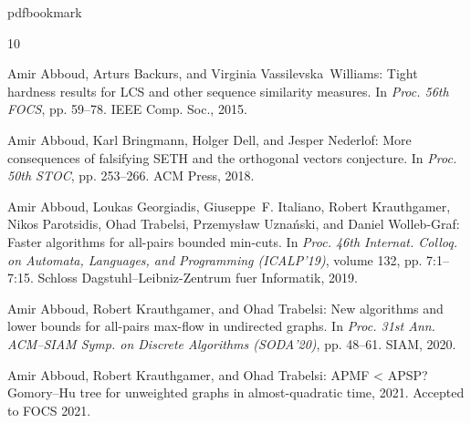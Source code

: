 \newcommand{\prelim}{Preliminary version in\ }
\providecommand{\bibhead}[1]{}
\expandafter\ifx\csname pdfbookmark\endcsname\relax%
  \providecommand{\tocrefpdfbookmark}{}
\else\providecommand{\tocrefpdfbookmark}{%
   \hypertarget{tocreferences}{}%
   \pdfbookmark[1]{References}{tocreferences}}%
\fi

\tocrefpdfbookmark
\begin{thebibliography}{10}

\bibhead{ABV15}
{\sc Amir Abboud, Arturs Backurs, and Virginia Vassilevska~Williams}: Tight
  hardness results for {LCS} and other sequence similarity measures.
\newblock In {\em Proc. 56th FOCS}, pp. 59--78. IEEE Comp. Soc., 2015.

\bibhead{ABDN18}
{\sc Amir Abboud, Karl Bringmann, Holger Dell, and Jesper Nederlof}: More
  consequences of falsifying {SETH} and the orthogonal vectors conjecture.
\newblock In {\em Proc. 50th STOC}, pp. 253--266. ACM Press, 2018.
\newblock [\epfmtdoi{10.1145/3188745.3188938}]

\bibhead{A+18}
{\sc Amir Abboud, Loukas Georgiadis, Giuseppe~F. Italiano, Robert Krauthgamer,
  Nikos Parotsidis, Ohad Trabelsi, Przemys{\l}aw Uzna{\'n}ski, and Daniel
  Wolleb{-}Graf}: Faster algorithms for all-pairs bounded min-cuts.
\newblock In {\em Proc. 46th Internat. Colloq. on Automata, Languages, and
  Programming (ICALP'19)}, volume 132, pp. 7:1--7:15. Schloss
  Dagstuhl--Leibniz-Zentrum fuer Informatik, 2019.

\bibhead{conf-version}
{\sc Amir Abboud, Robert Krauthgamer, and Ohad Trabelsi}: New algorithms and
  lower bounds for all-pairs max-flow in undirected graphs.
\newblock In {\em Proc. 31st Ann. ACM--SIAM Symp. on Discrete Algorithms
  (SODA'20)}, pp. 48--61. SIAM, 2020.

\bibhead{AKT21_arxiv}
{\sc Amir Abboud, Robert Krauthgamer, and Ohad Trabelsi}: {APMF} < {APSP}?
  {G}omory--{H}u tree for unweighted graphs in almost-quadratic time, 2021.
\newblock Accepted to FOCS 2021.


\end{thebibliography}
